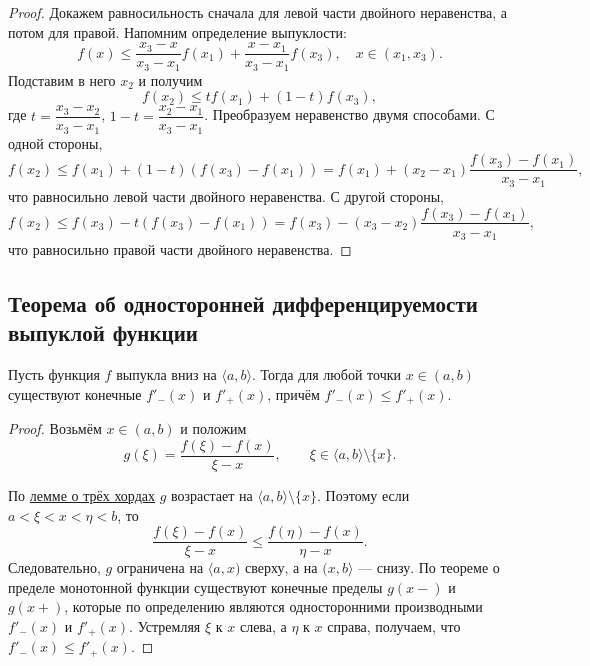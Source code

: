 \begin{proof}
	Докажем равносильность сначала для левой части двойного неравенства, а потом для правой.
	Напомним определение выпуклости: \[
	f(x) \leqslant \frac{x_3 - x}{x_3 - x_1} f(x_1) + \frac{x - x_1}{x_3 - x_1} f(x_3), \quad x \in (x_1, x_3).
	\]
	Подставим в него \(x_2\) и получим \[
	f(x_2) \leqslant t f(x_1) + (1 - t) f(x_3),
	\]
	где \(t = \dfrac{x_3 - x_2}{x_3 - x_1}\), \(1 - t = \dfrac{x_2 - x_1}{x_3 - x_1}\).
	Преобразуем неравенство двумя способами. С одной стороны, \[
	f(x_2) \leqslant f(x_1) + (1 - t)(f(x_3) - f(x_1)) = f(x_1) + (x_2 - x_1) \frac{f(x_3) - f(x_1)}{x_3 - x_1},
	\]
	что равносильно левой части двойного неравенства. С другой стороны, \[
	f(x_2) \leqslant f(x_3) - t (f(x_3) - f(x_1)) = f(x_3) - (x_3 - x_2) \frac{f(x_3) - f(x_1)}{x_3 - x_1},
	\] что равносильно правой части двойного неравенства.
\end{proof}

\subsection{Теорема об односторонней дифференцируемости выпуклой функции}

\begin{theorem}
	Пусть функция \(f\) выпукла вниз на \(\langle a, b \rangle\). Тогда для любой точки \(x \in (a, b)\) существуют конечные \(f'_-(x)\) и \(f'_+(x)\), причём \(f'_-(x) \leqslant f'_+(x)\).
\end{theorem}

\begin{proof}
	Возьмём \(x \in (a, b)\) и положим \[
	g(\xi) = \frac{f(\xi) - f(x)}{\xi - x}, \qquad \xi \in \langle a, b \rangle \setminus \{x\}.
	\]
	
	По \hyperlink{trihordy}{лемме о трёх хордах} \(g\) возрастает на \(\langle a, b \rangle \setminus \{x\}\). Поэтому если \hbox{\(a < \xi < x < \eta < b\)}, то \[
	\frac{f(\xi) - f(x)}{\xi - x} \leqslant \frac{f(\eta) - f(x)}{\eta - x}.
	\]
	Следовательно, \(g\) ограничена на \(\langle a, x)\) сверху, а на \((x, b \rangle\) --- снизу. По теореме о пределе монотонной функции существуют конечные пределы \(g(x-)\) и \(g(x+)\), которые по определению являются односторонними производными \(f'_-(x)\) и \(f'_+(x)\). Устремляя \(\xi\) к \(x\) слева, а \(\eta\) к \(x\) справа, получаем, что \(f'_-(x) \leqslant f'_+(x)\). 
\end{proof}


